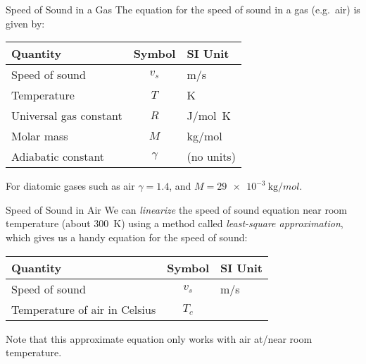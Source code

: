 \documentclass[12pt,aspectratio=169]{beamer}
\newcommand{\eq}[2]{\vspace{#1}{\Large\begin{displaymath}#2\end{displaymath}}}
\begin{document}
\begin{frame}{Speed of Sound in a Gas}
  The equation for the speed of sound in a gas (e.g.\ air) is given by:

  \eq{-.2in}{
    \boxed{v_s=\sqrt{\frac{\gamma RT}{M}}}
  }
  \begin{center}
    \begin{tabular}{l|c|l}
      \rowcolor{pink}
      \textbf{Quantity} & \textbf{Symbol} & \textbf{SI Unit} \\ \hline
      Speed of sound         & $v_s$ & \si{m/s}\\
      Temperature            & $T$  & \si{\kelvin}\\
      Universal gas constant & $R$  & \si{J/mol.K}\\
      Molar mass             & $M$  & \si{\kilo\gram/mol}\\
      Adiabatic constant     & $\gamma$  & (no units)
    \end{tabular}
  \end{center}
  For diatomic gases such as air $\gamma=1.4$, and
  $M=\SI{29e-3}{\kilo\gram/mol}$.
\end{frame}



\begin{frame}{Speed of Sound in Air}
  We can \emph{linearize} the speed of sound equation near room temperature
  (about \SI{300}{\kelvin}) using a method called
  \emph{least-square approximation}, which gives us a handy equation for the
  speed of sound:
  
  \eq{-.3in}{ v_s=331 + 0.59T_C
  }
  \begin{center}
    \begin{tabular}{l|c|l}
      \rowcolor{pink}
      \textbf{Quantity} & \textbf{Symbol} & \textbf{SI Unit} \\ \hline
      Speed of sound     & $v_s$ & \si{m/s}\\
      Temperature of air in Celsius & $T_c$ & 
    \end{tabular}
  \end{center}
  Note that this approximate equation only works with air at/near room
  temperature.
\end{frame}
\end{document}

